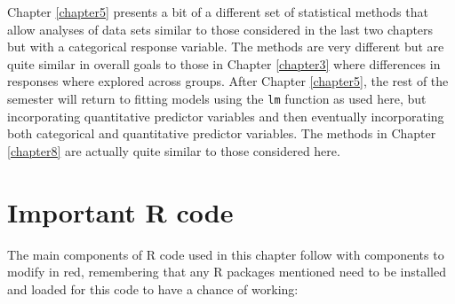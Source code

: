 \documentclass[]{book}
\theoremstyle{definition}
\theoremstyle{definition}
\theoremstyle{remark}
\begin{document}
Chapter \ref{chapter5} presents a bit of a different set of statistical
methods that allow analyses of data sets similar to those considered in
the last two chapters but with a categorical response variable. The
methods are very different but are quite similar in overall goals to
those in Chapter \ref{chapter3} where differences in responses where
explored across groups. After Chapter \ref{chapter5}, the rest of the
semester will return to fitting models using the \texttt{lm} function as
used here, but incorporating quantitative predictor variables and then
eventually incorporating both categorical and quantitative predictor
variables. The methods in Chapter \ref{chapter8} are actually quite
similar to those considered here.

\section{Important R code}\label{section4-8}

The main components of R code used in this chapter follow with
components to modify in red, remembering that any R packages mentioned
need to be installed and loaded for this code to have a chance of
working:
\end{document}
